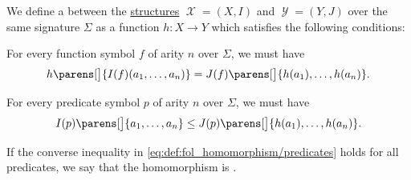 \begin{definition}\label{def:fol_homomorphism}
  We define a  between the \hyperref[def:fol_structure]{structures} \( \mscrX = (X, I) \) and \( \mscrY = (Y, J) \) over the same signature \( \Sigma \) as a function \( h: X \to Y \) which satisfies the following conditions:
  \begin{thmenum}
     For every function symbol \( f \) of arity \( n \) over \( \Sigma \), we must have
    \begin{equation}\label{eq:def:fol_homomorphism/functions}
      h\parens[\big]{ I(f)(a_1, \ldots, a_n) } = J(f)\parens[\big]{ h(a_1), \ldots, h(a_n) }.
    \end{equation}

     For every predicate symbol \( p \) of arity \( n \) over \( \Sigma \), we must have
    \begin{equation}\label{eq:def:fol_homomorphism/predicates}
      I(p)\parens[\big]{ a_1, \ldots, a_n } \leq J(p)\parens[\big]{ h(a_1), \ldots, h(a_n) }.
    \end{equation}

    If the converse inequality in \eqref{eq:def:fol_homomorphism/predicates} holds for all predicates, we say that the homomorphism is .
  \end{thmenum}
\end{definition}
